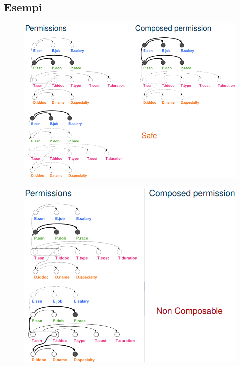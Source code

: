 \documentclass{report}
\begin{document}
\subsection{Esempi}

\begin{figure}[H]
    \centering
    \includegraphics[width=1\linewidth]{images/safe1.png}
\end{figure}

\begin{figure}[H]
    \centering
    \includegraphics[width=1\linewidth]{images/safe2.png}
\end{figure}
\end{document}
